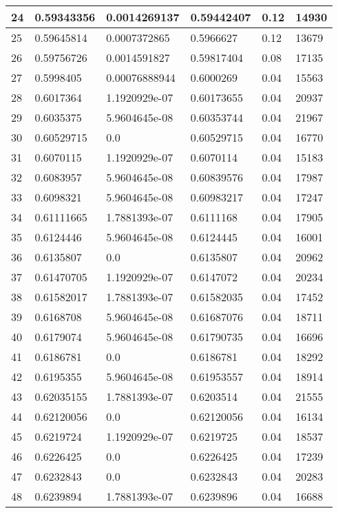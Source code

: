\begin{longtable}{|l|l|l|l|l|l|}
24 & 0.59343356 & 0.0014269137 & 0.59442407 & 0.12 & 14930 \\ \hline 
25 & 0.59645814 & 0.0007372865 & 0.5966627 & 0.12 & 13679 \\ \hline 
26 & 0.59756726 & 0.0014591827 & 0.59817404 & 0.08 & 17135 \\ \hline 
27 & 0.5998405 & 0.00076888944 & 0.6000269 & 0.04 & 15563 \\ \hline 
28 & 0.6017364 & 1.1920929e-07 & 0.60173655 & 0.04 & 20937 \\ \hline 
29 & 0.6035375 & 5.9604645e-08 & 0.60353744 & 0.04 & 21967 \\ \hline 
30 & 0.60529715 & 0.0 & 0.60529715 & 0.04 & 16770 \\ \hline 
31 & 0.6070115 & 1.1920929e-07 & 0.6070114 & 0.04 & 15183 \\ \hline 
32 & 0.6083957 & 5.9604645e-08 & 0.60839576 & 0.04 & 17987 \\ \hline 
33 & 0.6098321 & 5.9604645e-08 & 0.60983217 & 0.04 & 17247 \\ \hline 
34 & 0.61111665 & 1.7881393e-07 & 0.6111168 & 0.04 & 17905 \\ \hline 
35 & 0.6124446 & 5.9604645e-08 & 0.6124445 & 0.04 & 16001 \\ \hline 
36 & 0.6135807 & 0.0 & 0.6135807 & 0.04 & 20962 \\ \hline 
37 & 0.61470705 & 1.1920929e-07 & 0.6147072 & 0.04 & 20234 \\ \hline 
38 & 0.61582017 & 1.7881393e-07 & 0.61582035 & 0.04 & 17452 \\ \hline 
39 & 0.6168708 & 5.9604645e-08 & 0.61687076 & 0.04 & 18711 \\ \hline 
40 & 0.6179074 & 5.9604645e-08 & 0.61790735 & 0.04 & 16696 \\ \hline 
41 & 0.6186781 & 0.0 & 0.6186781 & 0.04 & 18292 \\ \hline 
42 & 0.6195355 & 5.9604645e-08 & 0.61953557 & 0.04 & 18914 \\ \hline 
43 & 0.62035155 & 1.7881393e-07 & 0.6203514 & 0.04 & 21555 \\ \hline 
44 & 0.62120056 & 0.0 & 0.62120056 & 0.04 & 16134 \\ \hline 
45 & 0.6219724 & 1.1920929e-07 & 0.6219725 & 0.04 & 18537 \\ \hline 
46 & 0.6226425 & 0.0 & 0.6226425 & 0.04 & 17239 \\ \hline 
47 & 0.6232843 & 0.0 & 0.6232843 & 0.04 & 20283 \\ \hline 
48 & 0.6239894 & 1.7881393e-07 & 0.6239896 & 0.04 & 16688 \\ \hline 

\end{longtable}
